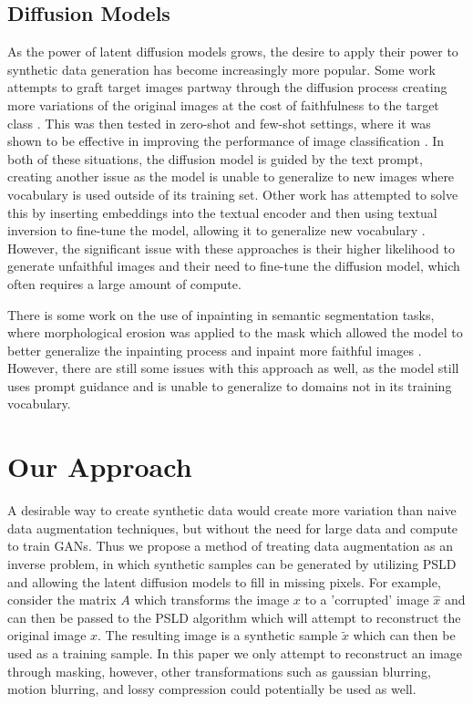 \documentclass{article}
\begin{document}
\subsection{Diffusion Models}

As the power of latent diffusion models grows, the desire to apply their power to synthetic data generation has become increasingly more popular. Some work
attempts to graft target images partway through the diffusion process creating more variations of the original images at the cost of faithfulness to the target
class \cite{2108.01073}. This was then tested in zero-shot and few-shot settings, where it was shown to be effective in improving the performance of image 
classification \cite{2210.07574}. In both of these situations, the diffusion model is guided by the text prompt, creating another issue as the model is unable to
generalize to new images where vocabulary is used outside of its training set. Other work has attempted to solve this by inserting embeddings into the textual encoder
and then using textual inversion to fine-tune the model, allowing it to generalize new vocabulary \cite{2302.07944}. However, the significant issue with these approaches
is their higher likelihood to generate unfaithful images and their need to fine-tune the diffusion model, which often requires a large amount of compute.

There is some work on the use of inpainting in semantic segmentation tasks, where morphological erosion was applied to the mask which allowed the model to better
generalize the inpainting process and inpaint more faithful images \cite{Pobitzer_2023}. However, there are still some issues with this approach as well,
as the model still uses prompt guidance and is unable to generalize to domains not in its training vocabulary.

\section{Our Approach}

A desirable way to create synthetic data would create more variation than naive data augmentation techniques, but without the need for
large data and compute to train GANs. Thus we propose a method of treating data augmentation as an inverse problem, in which synthetic samples
can be generated by utilizing PSLD and allowing the latent diffusion models to fill in missing pixels. For example, consider the matrix $A$ which
transforms the image $x$ to a 'corrupted' image $\hat{x}$ and can then be passed to the PSLD algorithm which will attempt to reconstruct
the original image $x$. The resulting image is a synthetic sample $\tilde{x}$ which can then be used as a training sample. In this paper we
only attempt to reconstruct an image through masking, however, other transformations such as gaussian blurring, motion blurring, and lossy compression
could potentially be used as well.
\end{document}
